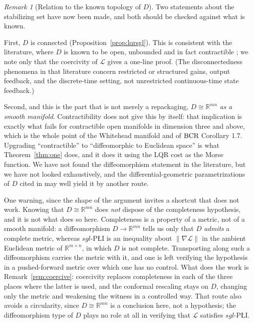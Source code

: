 \documentclass[11pt]{article}
\theoremstyle{plain}
\theoremstyle{definition}
\theoremstyle{remark}
\newtheorem{rem}[thm]{Remark}
\newcommand{\R}{\mathbb{R}}
\newcommand{\bcr}{\textup{BCR}}
\begin{document}
\begin{rem}[Relation to the known topology of $D$]\label{rem:topology}
Two statements about the stabilizing set have now been made, and both should be
checked against what is known.

First, $D$ is connected (Proposition~\ref{prop:lqrsgl}). This is consistent with
the literature, where $D$ is known to be open, unbounded and in fact contractible
\cite{BuMesbahiMesbahi2021}; we note only that the coercivity of $\mathcal{L}$
gives a one-line proof. (The
disconnectedness phenomena in that literature concern restricted or structured
gains, output feedback, and the discrete-time setting, not unrestricted
continuous-time state feedback.)

Second, and this is the part that is not merely a repackaging,
$D\cong\R^{mn}$ \emph{as a smooth manifold}. Contractibility does not give this
by itself: that implication is exactly what fails for contractible open manifolds
in dimension three and above, which is the whole point of the Whitehead manifold
and of $\bcr$ Corollary 1.7. Upgrading ``contractible'' to ``diffeomorphic to
Euclidean space'' is what Theorem~\ref{thm:one} does, and it does it using the
LQR cost as the Morse function. We have not found the diffeomorphism statement in
the literature, but we have not looked exhaustively, and the differential-geometric
parametrizations of $D$ cited in \cite{BuMesbahiMesbahi2021} may well yield it by
another route.

One warning, since the shape of the argument invites a shortcut that does not
work. Knowing that $D\cong\R^{mn}$ does \emph{not} dispose of the completeness
hypothesis, and it is not what does so here. Completeness is a property of a
metric, not of a smooth manifold: a diffeomorphism $D\to\R^{mn}$ tells us only
that $D$ \emph{admits} a complete metric, whereas $sgl$-P\L{}I is an inequality
about $\|\nabla\mathcal{L}\|$ in the ambient Euclidean metric of $\R^{m\times n}$,
in which $D$ is not complete. Transporting along such a diffeomorphism carries the
metric with it, and one is left verifying the hypothesis in a pushed-forward metric
over which one has no control. What does the work is
Remark~\ref{rem:coercive}: coercivity replaces completeness in each of the three
places where the latter is used, and the conformal rescaling stays on $D$, changing
only the metric and weakening the witness in a controlled way. That route also
avoids a circularity, since $D\cong\R^{mn}$ is a conclusion here, not a hypothesis;
the diffeomorphism type of $D$ plays no role at all in verifying that
$\mathcal{L}$ satisfies $sgl$-P\L{}I.
\end{rem}
\end{document}

